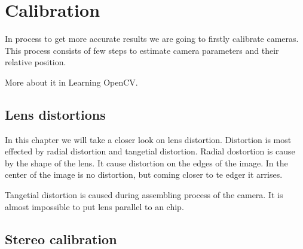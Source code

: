 \chapter{Calibration}

In process to get more accurate results we are going to firstly calibrate
cameras. This process consists of few steps to estimate camera parameters and
their relative position.

More about it in Learning OpenCV.

\section{Lens distortions}

In this chapter we will take a closer look on lens distortion. Distortion is
most effected by radial distortion and tangetial distortion. Radial dostortion
is cause by the shape of the lens. It cause distortion on the edges of the
image. In the center of the image is no distortion, but coming closer to te
edger it arrises.

Tangetial distortion is caused during assembling process of the camera. It is
almost impossible to put lens parallel to an chip.

\section{Stereo calibration}

